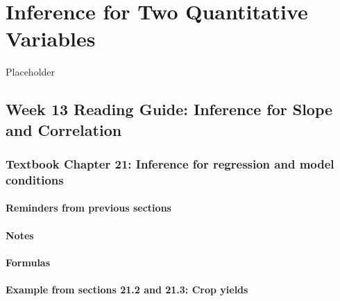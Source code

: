\documentclass[
]{report}
\begin{document}
\hypertarget{inference-for-two-quantitative-variables}{%
\chapter{Inference for Two Quantitative Variables}\label{inference-for-two-quantitative-variables}}

Placeholder

\hypertarget{week-13-reading-guide-inference-for-slope-and-correlation}{%
\section{Week 13 Reading Guide: Inference for Slope and Correlation}\label{week-13-reading-guide-inference-for-slope-and-correlation}}

\hypertarget{textbook-chapter-21-inference-for-regression-and-model-conditions}{%
\subsection*{Textbook Chapter 21: Inference for regression and model conditions}\label{textbook-chapter-21-inference-for-regression-and-model-conditions}}

\hypertarget{reminders-from-previous-sections-11}{%
\subsubsection*{Reminders from previous sections}\label{reminders-from-previous-sections-11}}

\hypertarget{notes-25}{%
\subsubsection*{Notes}\label{notes-25}}

\hypertarget{formulas-6}{%
\subsubsection*{Formulas}\label{formulas-6}}

\hypertarget{example-from-sections-21.2-and-21.3-crop-yields}{%
\subsubsection*{Example from sections 21.2 and 21.3: Crop yields}\label{example-from-sections-21.2-and-21.3-crop-yields}}
\end{document}
